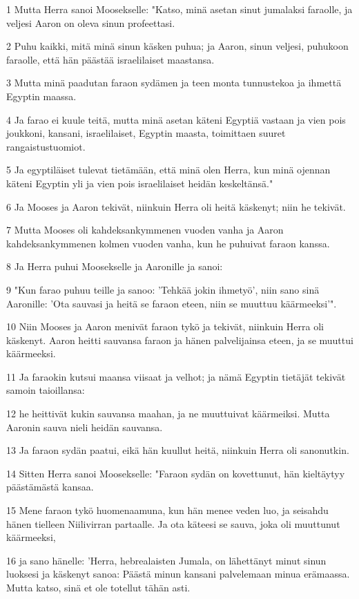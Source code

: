 \par 1 Mutta Herra sanoi Moosekselle: "Katso, minä asetan sinut jumalaksi faraolle, ja veljesi Aaron on oleva sinun profeettasi.
\par 2 Puhu kaikki, mitä minä sinun käsken puhua; ja Aaron, sinun veljesi, puhukoon faraolle, että hän päästää israelilaiset maastansa.
\par 3 Mutta minä paadutan faraon sydämen ja teen monta tunnustekoa ja ihmettä Egyptin maassa.
\par 4 Ja farao ei kuule teitä, mutta minä asetan käteni Egyptiä vastaan ja vien pois joukkoni, kansani, israelilaiset, Egyptin maasta, toimittaen suuret rangaistustuomiot.
\par 5 Ja egyptiläiset tulevat tietämään, että minä olen Herra, kun minä ojennan käteni Egyptin yli ja vien pois israelilaiset heidän keskeltänsä."
\par 6 Ja Mooses ja Aaron tekivät, niinkuin Herra oli heitä käskenyt; niin he tekivät.
\par 7 Mutta Mooses oli kahdeksankymmenen vuoden vanha ja Aaron kahdeksankymmenen kolmen vuoden vanha, kun he puhuivat faraon kanssa.
\par 8 Ja Herra puhui Moosekselle ja Aaronille ja sanoi:
\par 9 "Kun farao puhuu teille ja sanoo: 'Tehkää jokin ihmetyö', niin sano sinä Aaronille: 'Ota sauvasi ja heitä se faraon eteen, niin se muuttuu käärmeeksi'".
\par 10 Niin Mooses ja Aaron menivät faraon tykö ja tekivät, niinkuin Herra oli käskenyt. Aaron heitti sauvansa faraon ja hänen palvelijainsa eteen, ja se muuttui käärmeeksi.
\par 11 Ja faraokin kutsui maansa viisaat ja velhot; ja nämä Egyptin tietäjät tekivät samoin taioillansa:
\par 12 he heittivät kukin sauvansa maahan, ja ne muuttuivat käärmeiksi. Mutta Aaronin sauva nieli heidän sauvansa.
\par 13 Ja faraon sydän paatui, eikä hän kuullut heitä, niinkuin Herra oli sanonutkin.
\par 14 Sitten Herra sanoi Moosekselle: "Faraon sydän on kovettunut, hän kieltäytyy päästämästä kansaa.
\par 15 Mene faraon tykö huomenaamuna, kun hän menee veden luo, ja seisahdu hänen tielleen Niilivirran partaalle. Ja ota käteesi se sauva, joka oli muuttunut käärmeeksi,
\par 16 ja sano hänelle: 'Herra, hebrealaisten Jumala, on lähettänyt minut sinun luoksesi ja käskenyt sanoa: Päästä minun kansani palvelemaan minua erämaassa. Mutta katso, sinä et ole totellut tähän asti.
